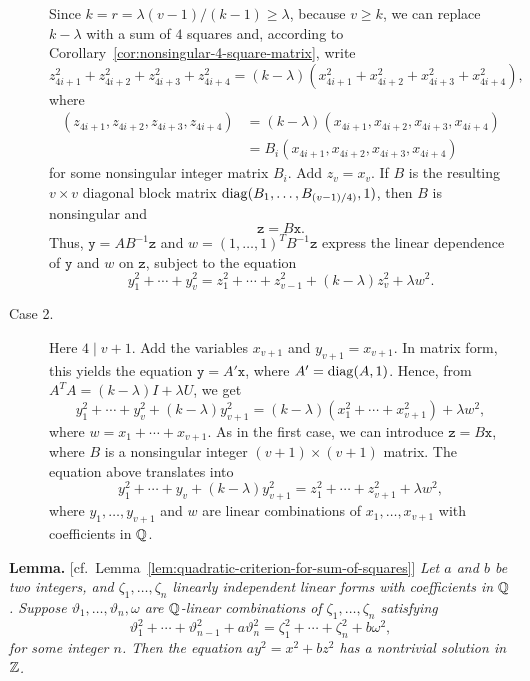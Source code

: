 \begin{solution}
\begin{description}
        Since $k=r=\lambda(v-1)/(k-1)\ge\lambda$, because $v\ge k$, we can replace $k-\lambda$ with a sum of $4$ squares and, according to Corollary~\ref{cor:nonsingular-4-square-matrix}, write
        $$
            z_{4i+1}^2+z_{4i+2}^2+z_{4i+3}^2+z_{4i+4}^2
                = (k-\lambda)(x_{4i+1}^2+x_{4i+2}^2+
                    x_{4i+3}^2+x_{4i+4}^2),
        $$
        where
        \begin{align*}
            (z_{4i+1},z_{4i+2},z_{4i+3},z_{4i+4})
                &= (k-\lambda)(x_{4i+1},x_{4i+2},x_{4i+3},x_{4i+4})\\
                &= B_i(x_{4i+1},x_{4i+2},x_{4i+3},x_{4i+4})
        \end{align*}
        for some nonsingular integer matrix $B_i$. Add $z_v=x_v$. If $B$ is the resulting $v\times v$ diagonal block matrix ${\operatorname{diag}}(B_1,\dots,B_{(v-1)/4)},1)$, then $B$ is nonsingular and
        $$
            \mathtt z=B\mathtt x.
        $$
        Thus, $\mathtt y = AB^{-1}\mathtt z$ and\/ $w = (1,\dots,1)^T B^{-1}\mathtt z$ express the linear dependence of\/ $\mathtt y$ and\/ $w$ on\/ $\mathtt z$, subject to the equation
        \[
            y_1^2 + \cdots + y_v^2
                = z_1^2 + \cdots + z_{v-1}^2 + (k - \lambda) z_v^2 + \lambda w^2.
        \]

        \item[Case 2.] Here $4\mid v+1$. Add the variables\/ $x_{v+1}$ and\/ $y_{v+1}=x_{v+1}$. In matrix form, this yields the equation\/ $\mathtt y=A'\mathtt x$, where\/ $A'={\operatorname{diag}}(A,1)$. Hence, from $A^TA=(k-\lambda)I+\lambda U$, we get
        \[
            y_1^2+\cdots+y_v^2+(k-\lambda)y_{v+1}^2
                = (k-\lambda)(x_1^2+\cdots+x_{v+1}^2) + \lambda w^2,
        \]
        where $w=x_1+\cdots+x_{v+1}$. As in the first case, we can introduce $\mathtt z=B\mathtt x$, where $B$ is a nonsingular integer $(v+1)\times(v+1)$ matrix. The equation above translates into
        \[
            y_1^2+\cdots+y_v+(k-\lambda)y_{v+1}^2
                = z_1^2+\cdots+z_{v+1}^2 + \lambda w^2,
        \]
        where $y_1,\dots,y_{v+1}$ and $w$ are linear combinations of $x_1,\dots,x_{v+1}$ with coefficients in $\mathbb{Q}$.
        
    \end{description}

    \textbf{Lemma.} [cf.~Lemma~\ref{lem:quadratic-criterion-for-sum-of-squares}] \textit{Let\/ $a$ and $b$ be two integers, and $\zeta_1,\dots,\zeta_n$ linearly independent linear forms with coefficients in\/ $\mathbb{Q}$. Suppose\/ $\vartheta_1,\dots,\vartheta_n,\omega$ are\/ $\mathbb{Q}$-linear combinations of\/ $\zeta_1,\dots,\zeta_n$ satisfying}
    \begin{equation}\label{eq:minimum-n}
        \vartheta_1^2+\cdots+\vartheta_{n-1}^2
            + a\vartheta_n^2
            = \zeta_1^2+\cdots+\zeta_n^2 + b\omega^2,
    \end{equation}
    \textit{for some integer\/ $n$. Then\/ the equation\/ $ay^2=x^2+bz^2$ has a nontrivial solution in\/ $\mathbb{Z}$.}


\end{solution}

